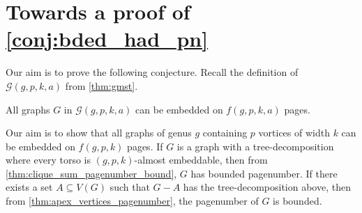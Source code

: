 
\newcommand{\gpk}{12gpk + 12gp + 18g + 12kp + 12p + 11}
\chapter{Towards a proof of \cref{conj:bded_had_pn}}\label{chap:Proving_The_Theorem}
Our aim is to prove the following conjecture. Recall the definition of $\mathcal{G}(g, p, k, a)$ from \cref{thm:gmst}. 
\begin{conjecture}\label{conj:gmst_conjecture_pagenumber}
	All graphs $G$ in $\mathcal{G}(g, p, k, a)$ can be embedded on \(f(g, p, k, a)\) pages.
\end{conjecture}
Our aim is to show that all graphs of genus \(g\) containing \(p\) vortices of width \(k\) can be embedded on \(f(g, p, k)\) pages. If $G$ is a graph with a tree-decomposition where every torso is $(g, p, k)$-almost embeddable, then from \cref{thm:clique_sum_pagenumber_bound}, $G$ has bounded pagenumber. If there exists a set $A \subseteq V(G)$ such that $G - A$ has the tree-decomposition above, then from \cref{thm:apex_vertices_pagenumber}, the pagenumber of $G$ is bounded.
















